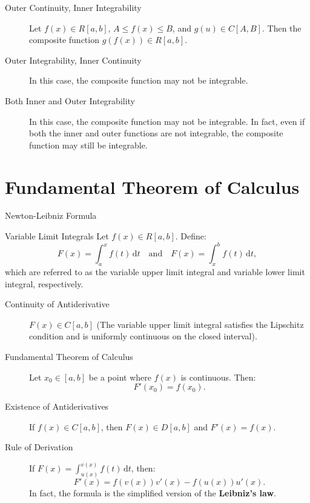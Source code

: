 \documentclass[11pt]{../../TexTemplate/elegantbook}
\begin{document}
\begin{description}
    \item [Outer Continuity, Inner Integrability] Let \( f(x) \in R[a, b] \), \( A \leqslant f(x) \leqslant B \), 
        and \( g(u) \in C[A, B] \). Then the composite function \( g(f(x)) \in R[a, b] \).
    \item [Outer Integrability, Inner Continuity] In this case, the composite function may not be integrable.

    \item [Both Inner and Outer Integrability] In this case, the composite function may not be integrable. 
        In fact, even if both the inner and outer functions are not integrable, the composite function may still be integrable.
\end{description}



\section{Fundamental Theorem of Calculus}
\begin{leftbarTitle}{Newton-Leibniz Formula}\end{leftbarTitle}
\begin{definition}{Variable Limit Integrals}
    Let \( f(x) \in R[a, b] \). Define:
    \[
    F(x) = \int_{a}^{x} f(t) \, \mathrm{d}t \quad \text{and} \quad F(x) = \int_{x}^{b} f(t) \, \mathrm{d}t,
    \]
    which are referred to as the variable upper limit integral and variable lower limit integral, respectively.
\end{definition}

\begin{property}
    \begin{description}
        \item [Continuity of Antiderivative]  \( F(x) \in C[a, b] \) (The variable upper limit integral satisfies the 
            Lipschitz condition and is uniformly continuous on the closed interval).
        \item [Fundamental Theorem of Calculus] Let \( x_0 \in [a, b] \) be a point where \( f(x) \) is continuous. Then:
            \[
            F'(x_0) = f(x_0).
            \]
        \item [Existence of Antiderivatives] If \( f(x) \in C[a, b] \), then \( F(x) \in D[a, b] \) and \( F'(x) = f(x) \).
        \item [Rule of Derivation] If \( F(x) = \int_{u(x)}^{v(x)} f(t) \, \mathrm{d}t \), then:
            \[
            F'(x) = f(v(x))v'(x) - f(u(x))u'(x).
            \]
            In fact, the formula is the simplified version of the \textbf{Leibniz's law}.
    \end{description}
\end{property}
\end{document}
